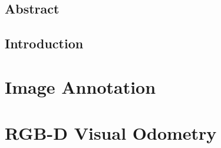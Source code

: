 \frontmatter



\pagestyle{fancy}
\fancyhf{}
\fancyhead[LE]{\leftmark}
\fancyhead[RO]{\rightmark}
\fancyhead[LO]{\today}
\fancyfoot[CE,CO]{\thepage}

\newcommand\Axel[1]{\textbf{\textcolor{red}{(A: #1)}}}

% 

\chapter*{Abstract}
\small
\vspace{-1em}

\normalsize

\dominitoc%
\tableofcontents

\mainmatter%

\lstset{style=CodeStyle}

\chapter*{Introduction}%
\label{cha:introduction}


\part{Image Annotation}%
\label{prt:image_annotation}


\part{RGB-D Visual Odometry}%
\label{prt:rgb_d_vo}



